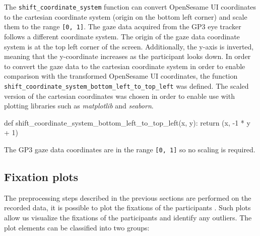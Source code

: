 \documentclass[
  a4paper,
]{article}
\newenvironment{Shaded}{}{}
\newcommand{\ControlFlowTok}[1]{\textcolor[rgb]{0.84,0.23,0.29}{#1}}
\newcommand{\DecValTok}[1]{\textcolor[rgb]{0.00,0.36,0.77}{#1}}
\newcommand{\KeywordTok}[1]{\textcolor[rgb]{0.84,0.23,0.29}{#1}}
\newcommand{\NormalTok}[1]{\textcolor[rgb]{0.14,0.16,0.18}{#1}}
\newcommand{\OperatorTok}[1]{\textcolor[rgb]{0.14,0.16,0.18}{#1}}
\begin{document}
The \texttt{shift\_coordinate\_system} function can convert OpenSesame
UI coordinates to the cartesian coordinate system (origin on the bottom
left corner) and scale them to the range \texttt{{[}0,\ 1{]}}. The gaze
data acquired from the GP3 eye tracker follows a different coordinate
system. The origin of the gaze data coordinate system is at the top left
corner of the screen. Additionally, the y-axis is inverted, meaning that
the y-coordinate increases as the participant looks down. In order to
convert the gaze data to the cartesian coordinate system in order to
enable comparison with the transformed OpenSesame UI coordinates, the
function \texttt{shift\_coordinate\_system\_bottom\_left\_to\_top\_left}
was defined. The scaled version of the cartesian coordinates was chosen
in order to enable use with plotting libraries such as \emph{matplotlib}
and \emph{seaborn}.

\begin{Shaded}
\begin{Highlighting}[]
\KeywordTok{def}\NormalTok{ shift\_coordinate\_system\_bottom\_left\_to\_top\_left(x, y):}
    \ControlFlowTok{return}\NormalTok{ (x, }\OperatorTok{{-}}\DecValTok{1} \OperatorTok{*}\NormalTok{ y }\OperatorTok{+} \DecValTok{1}\NormalTok{)}
\end{Highlighting}
\end{Shaded}

\begin{tcolorbox}[enhanced jigsaw, colback=white, colbacktitle=quarto-callout-note-color!10!white, titlerule=0mm, opacitybacktitle=0.6, left=2mm, toptitle=1mm, leftrule=.75mm, opacityback=0, breakable, bottomrule=.15mm, colframe=quarto-callout-note-color-frame, rightrule=.15mm, coltitle=black, bottomtitle=1mm, toprule=.15mm, title=\textcolor{quarto-callout-note-color}{\faInfo}\hspace{0.5em}{Nota Bene}, arc=.35mm]

The GP3 gaze data coordinates are in the range \texttt{{[}0,\ 1{]}} so
no scaling is required.

\end{tcolorbox}

\hypertarget{fixation-plots}{%
\subsection{Fixation plots}\label{fixation-plots}}

The preprocessing steps described in the previous sections are performed
on the recorded data, it is possible to plot the fixations of the
participants . Such plots allow us visualize the fixations of the
participants and identify any outliers. The plot elements can be
classified into two groups:
\end{document}
